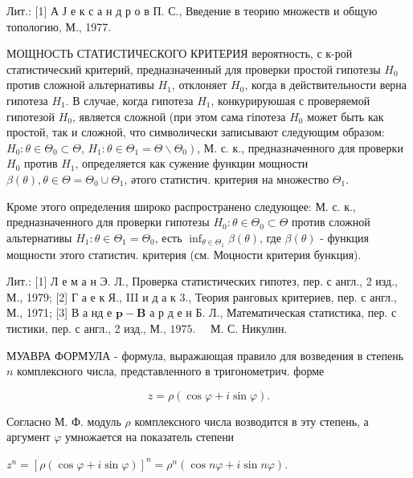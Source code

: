 \documentclass[10pt]{article}
\begin{document}
Лит.: [1] А Ј е к с а н д р о в П. С., Введение в теорию множеств и общую топологию, М., 1977.



МОЩНОСТЬ СТАТИСТИЧЕСКОГО КРИТЕРИЯ вероятность, с к-рой статистический критерий, предназначенный для проверки простой гипотезы $H_{0}$ против сложной альтернативы $H_{1}$, отклоняет $H_{0}$, когда в действительности верна гипотеза $H_{1}$. В случае, когда гипотеза $H_{1}$, конкурируюшая с проверяемой гипотезой $H_{0}$, является сложной (при этом сама гіпотеза $H_{0}$ может быть как простой, так и сложной, что символически записывают следующим образом: $H_{0}: \theta \in \Theta_{0} \subset \Theta$, $\left.H_{1}: \theta \in \Theta_{1}=\Theta \backslash \Theta_{0}\right)$, М. с. к., предназначенного для проверки $H_{0}$ против $H_{1}$, определяется как сужение функции мощности $\beta(\theta), \theta \in \Theta=\Theta_{0} \cup \Theta_{1}$, әтого статистич. критерия на множество $\Theta_{1}$.



Кроме этого определения широко распространено следующее: М. с. к., предназначенного для проверки гипотезы $H_{0}: \theta \in \Theta_{0} \subset \Theta$ против сложной альтернативы $H_{1}: \theta \in \Theta_{1}=\Theta_{0}$, есть $\inf _{\theta \in \Theta_{1}} \beta(\theta)$, где $\beta(\theta)$ - функция мощности этого статистич. критерия (см. Моцности критерия бункция).



Лит.: [1] Л е м а н Э. Л., Проверка статистических гипотез, пер. с англ., 2 изд., М., 1979; [2] Г а е к Я., III и д а к $3 .$, Теория ранговых критериев, пер. с англ., М., 1971; [3] В а нд е $\mathbf{p}-\mathbf{B}$ а р д е н Б. Л., Математическая статистика, пер. с тистики, пер. с англ., 2 изд., М., $1975 . \quad$ М. С. Никулин.



МУАВРА ФОРМУЛА - формула, выражающая правило для возведения в степень $n$ комплексного числа, представленного в тригонометрич. форме



\[

z=\rho(\cos \varphi+i \sin \varphi) .

\]



Согласно М. Ф. модуль $\rho$ комплексного числа возводится в эту степень, а аргумент $\varphi$ умножается на показатель степени



$z^{n}=[\rho(\cos \varphi+i \sin \varphi)]^{n}=\rho^{n}(\cos n \varphi+i \sin n \varphi)$.
\end{document}
